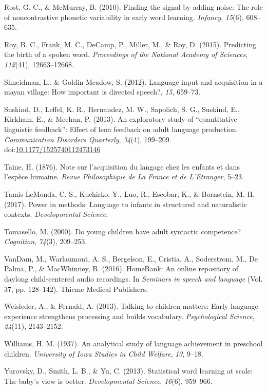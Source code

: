 \documentclass[man]{apa6}
\theoremstyle{definition}
\theoremstyle{definition}
\theoremstyle{definition}
\theoremstyle{remark}
\begin{document}
\hypertarget{ref-rost2010finding}{}
Rost, G. C., \& McMurray, B. (2010). Finding the signal by adding noise:
The role of noncontrastive phonetic variability in early word learning.
\emph{Infancy}, \emph{15}(6), 608--635.

\hypertarget{ref-roy2015predicting}{}
Roy, B. C., Frank, M. C., DeCamp, P., Miller, M., \& Roy, D. (2015).
Predicting the birth of a spoken word. \emph{Proceedings of the National
Academy of Sciences}, \emph{112}(41), 12663--12668.

\hypertarget{ref-shneidman2012language}{}
Shneidman, L., \& Goldin-Meadow, S. (2012). Language input and
acquisition in a mayan village: How important is directed speech?,
\emph{15}, 659--73.

\hypertarget{ref-suskind2013exploratory}{}
Suskind, D., Leffel, K. R., Hernandez, M. W., Sapolich, S. G., Suskind,
E., Kirkham, E., \& Meehan, P. (2013). An exploratory study of
``quantitative linguistic feedback'': Effect of lena feedback on adult
language production. \emph{Communication Disorders Quarterly},
\emph{34}(4), 199--209.
doi:\href{https://doi.org/10.1177/1525740112473146}{10.1177/1525740112473146}

\hypertarget{ref-taine1876note}{}
Taine, H. (1876). Note sur l'acquisition du langage chez les enfants et
dans l'espèce humaine. \emph{Revue Philosophique de La France et de
L'Etranger}, 5--23.

\hypertarget{ref-tamis2017power}{}
Tamis-LeMonda, C. S., Kuchirko, Y., Luo, R., Escobar, K., \& Bornstein,
M. H. (2017). Power in methods: Language to infants in structured and
naturalistic contexts. \emph{Developmental Science}.

\hypertarget{ref-tomasello2000young}{}
Tomasello, M. (2000). Do young children have adult syntactic competence?
\emph{Cognition}, \emph{74}(3), 209--253.

\hypertarget{ref-vandam2016homebank}{}
VanDam, M., Warlaumont, A. S., Bergelson, E., Cristia, A., Soderstrom,
M., De Palma, P., \& MacWhinney, B. (2016). HomeBank: An online
repository of daylong child-centered audio recordings. In \emph{Seminars
in speech and language} (Vol. 37, pp. 128--142). Thieme Medical
Publishers.

\hypertarget{ref-weisleder2013talking}{}
Weisleder, A., \& Fernald, A. (2013). Talking to children matters: Early
language experience strengthens processing and builds vocabulary.
\emph{Psychological Science}, \emph{24}(11), 2143--2152.

\hypertarget{ref-williams1937analytical}{}
Williams, H. M. (1937). An analytical study of language achievement in
preschool children. \emph{University of Iowa Studies in Child Welfare},
\emph{13}, 9--18.

\hypertarget{ref-yurovsky2013statistical}{}
Yurovsky, D., Smith, L. B., \& Yu, C. (2013). Statistical word learning
at scale: The baby's view is better. \emph{Developmental Science},
\emph{16}(6), 959--966.
\end{document}
